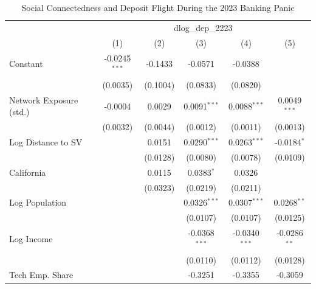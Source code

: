 \begin{table}[htbp]
   \caption{\label{tab:main} Social Connectedness and Deposit Flight During the 2023 Banking Panic}
   \bigskip
   \centering
   \footnotesize\begin{tabular}{lccccc}
      \toprule
       & \multicolumn{5}{c}{dlog\_dep\_2223}\\
                                 & (1)                  & (2)      & (3)             & (4)             & (5)\\  
      \midrule 
      Constant                   & -0.0245$^{***}$      & -0.1433  & -0.0571         & -0.0388         &   \\   
                                 & (0.0035)             & (0.1004) & (0.0833)        & (0.0820)        &   \\   
      Network Exposure (std.)    & -0.0004              & 0.0029   & 0.0091$^{***}$  & 0.0088$^{***}$  & 0.0049$^{***}$\\   
                                 & (0.0032)             & (0.0044) & (0.0012)        & (0.0011)        & (0.0013)\\   
      Log Distance to SV         &                      & 0.0151   & 0.0290$^{***}$  & 0.0263$^{***}$  & -0.0184$^{*}$\\   
                                 &                      & (0.0128) & (0.0080)        & (0.0078)        & (0.0109)\\   
      California                 &                      & 0.0115   & 0.0383$^{*}$    & 0.0326          &   \\   
                                 &                      & (0.0323) & (0.0219)        & (0.0211)        &   \\   
      Log Population             &                      &          & 0.0326$^{***}$  & 0.0307$^{***}$  & 0.0268$^{**}$\\   
                                 &                      &          & (0.0107)        & (0.0107)        & (0.0125)\\   
      Log Income                 &                      &          & -0.0368$^{***}$ & -0.0340$^{***}$ & -0.0286$^{**}$\\   
                                 &                      &          & (0.0110)        & (0.0112)        & (0.0128)\\   
      Tech Emp. Share            &                      &          & -0.3251         & -0.3355         & -0.3059\\   

\end{tabular}
\end{table}
